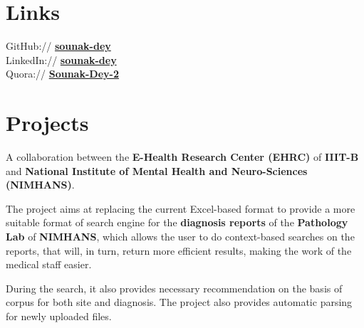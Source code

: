 \documentclass[]{essdee-resume}
\begin{document}
\begin{minipage}[t]{0.33\textwidth}
\section{Links} 
GitHub:// \href{https://github.com/Sounak-Dey}{\bf sounak-dey} \\
LinkedIn://  \href{https://www.linkedin.com/in/sounak-dey}{\bf sounak-dey} \\
Quora://  \href{https://www.quora.com/profile/Sounak-Dey-2}{\bf Sounak-Dey-2}


%
%

\end{minipage} 
\hfill
\begin{minipage}[t]{0.66\textwidth} 


\section{Projects}

\vspace{\topsep} %
\begin{tightemize}
\item A collaboration between the \textbf{E-Health Research Center (EHRC)} of \textbf{IIIT-B} and  \textbf{National Institute of Mental Health and Neuro-Sciences (NIMHANS)}. 
\item The project aims at replacing the current Excel-based format to provide a more suitable format of search engine for the \textbf{diagnosis reports} of the \textbf{Pathology Lab} of \textbf{NIMHANS}, which allows the user to do context-based searches on the reports, that will, in turn, return more efficient results, making the work of the medical staff easier.
\item During the search, it also provides necessary recommendation on the basis of corpus for both site and diagnosis. The project also provides automatic parsing for newly uploaded files. 
\end{tightemize}
\sectionsep


\end{minipage}
\end{document}
